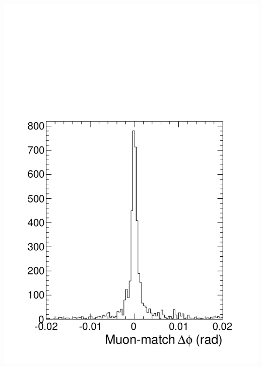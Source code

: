 \documentclass[compress]{beamer}
\begin{document}
\begin{frame}
\begin{columns}
\includegraphics[width=\linewidth]{match_dphi_background.pdf}
\end{columns}
\end{frame}
\end{document}
